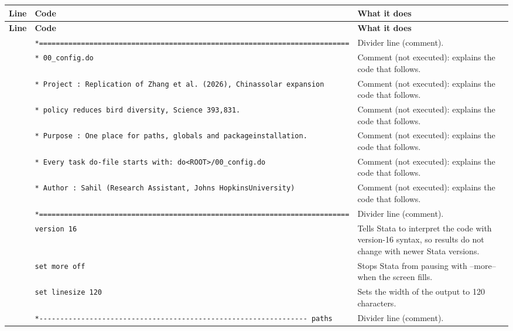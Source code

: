 \documentclass[10pt]{article}
\newcommand{\codetable}[1]{%
{\footnotesize
\begin{longtable}{>{\raggedleft\arraybackslash}p{0.55cm}>{\raggedright\arraybackslash}p{8.3cm}>{\raggedright\arraybackslash}p{8.0cm}}
\toprule \textbf{Line} & \textbf{Code} & \textbf{What it does}\\ \midrule \endfirsthead
\toprule \textbf{Line} & \textbf{Code} & \textbf{What it does}\\ \midrule \endhead
\bottomrule \endfoot
#1
\end{longtable}}}
\begin{document}
\codetable{1 & \texttt{*=========================================================\newline \hspace*{1em}=================} & Divider line (comment).\\
2 & \texttt{* 00\_config.do} & Comment (not executed): explains the code that follows.\\
3 & \texttt{* Project : Replication of Zhang et al. (2026), \textquotedbl{}China\textquotesingle{}s\newline \hspace*{1em}solar expansion} & Comment (not executed): explains the code that follows.\\
4 & \texttt{*           policy reduces bird diversity\textquotedbl{}, Science 393,\newline \hspace*{1em}831.} & Comment (not executed): explains the code that follows.\\
5 & \texttt{* Purpose : One place for paths, globals and package\newline \hspace*{1em}installation.} & Comment (not executed): explains the code that follows.\\
6 & \texttt{*           Every task do-{}file starts with:  do\newline \hspace*{1em}\textquotedbl{}<ROOT>/00\_config.do\textquotedbl{}} & Comment (not executed): explains the code that follows.\\
7 & \texttt{* Author  : Sahil (Research Assistant, Johns Hopkins\newline \hspace*{1em}University)} & Comment (not executed): explains the code that follows.\\
8 & \texttt{*=========================================================\newline \hspace*{1em}=================} & Divider line (comment).\\
9 & \texttt{version 16} & Tells Stata to interpret the code with version-16 syntax, so results do not change with newer Stata versions.\\
10 & \texttt{set more off} & Stops Stata from pausing with --more-- when the screen fills.\\
11 & \texttt{set linesize 120} & Sets the width of the output to 120 characters.\\
13 & \texttt{*-{}-{}-{}-{}-{}-{}-{}-{}-{}-{}-{}-{}-{}-{}-{}-{}-{}-{}-{}-{}-{}-{}-{}-{}-{}-{}-{}-{}-{}-{}-{}-{}-{}-{}-{}-{}-{}-{}-{}-{}-{}-{}-{}-{}-{}-{}-{}-{}-{}-{}-{}-{}-{}-{}-{}-{}-{}\newline \hspace*{1em}-{}-{}-{}-{}-{}-{}-{} paths} & Divider line (comment).\\
}
\end{document}
